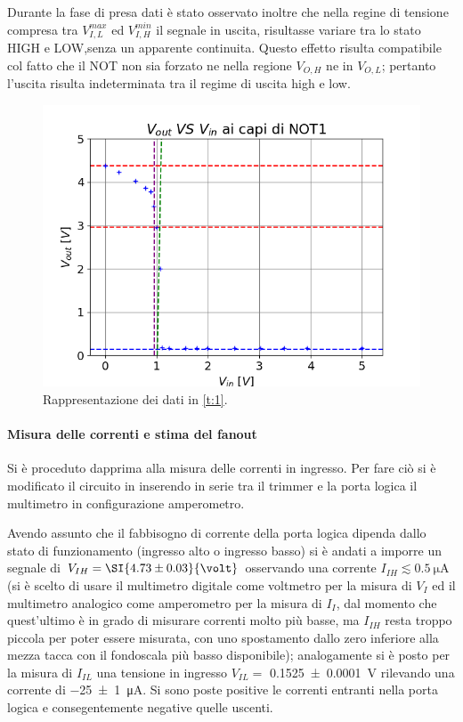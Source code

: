 Durante la fase di presa dati è stato osservato inoltre che nella regine di tensione compresa tra 	$V_{I,L}^{max}$ ed $V_{I,H}^{min}$ il segnale in uscita, risultasse variare tra lo stato HIGH e LOW,senza un apparente continuita.
Questo effetto risulta compatibile col fatto che il NOT non sia forzato ne nella regione $V_{O,H}$ ne in $V_{O,L}$; pertanto  l'uscita risulta indeterminata tra il regime di uscita high e low.
\begin{center}
	\begin{figure}[h]
		\includegraphics[scale=0.50]{../Figs-Tabs/in-ot2.png}
		\caption{Rappresentazione dei dati in \tablename{ \ref{t:1}}.}
		\label{f:i1}
	\end{figure}
\end{center}


\paragraph{Misura delle correnti e stima del fanout}
	Si è proceduto dapprima alla misura delle correnti in ingresso.
	Per fare ciò si è modificato il circuito in  inserendo in serie tra il trimmer e la porta logica il multimetro in configurazione amperometro.

	Avendo assunto che il fabbisogno di corrente della porta logica dipenda 	dallo stato di funzionamento (ingresso alto o ingresso basso)
	si è andati a imporre un segnale di $V_{IH} = \SI{4.73\pm 0.03}{\volt}$ osservando una corrente $I_{IH} \lesssim \SI{0.5}{\micro \ampere}$ (si è scelto di usare il multimetro digitale come voltmetro per la misura di $V_I$ ed il multimetro analogico come amperometro per la misura di $I_I$, dal momento che quest'ultimo è in grado di misurare correnti molto più basse, ma $I_{IH}$ resta troppo piccola per poter essere misurata, con uno spostamento dallo zero inferiore alla mezza tacca con il fondoscala più basso disponibile);
	analogamente si è posto per la misura di  $I_{IL}$ una tensione in ingresso $V_{IL} =$ \SI{0.1525(1)}{\volt} rilevando una corrente di \SI{-25(1)}{\micro \ampere}. Si sono poste positive le correnti entranti nella porta logica e consegentemente negative quelle uscenti.


